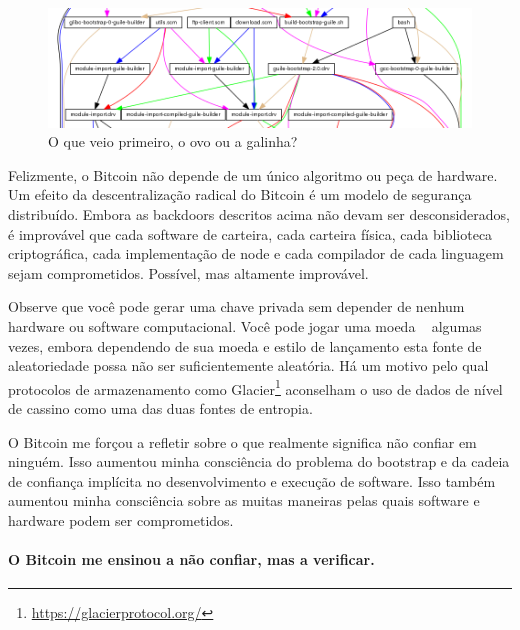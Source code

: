 \begin{figure}
  \includegraphics{assets/images/guix-bootstrap-dependencies.png}
  \caption{O que veio primeiro, o ovo ou a galinha?}
  \label{fig:guix-bootstrap-dependencies}
\end{figure}

Felizmente, o Bitcoin não depende de um único algoritmo ou peça de hardware. Um efeito da descentralização radical do Bitcoin é um modelo de segurança distribuído. Embora as backdoors descritos acima não devam ser desconsiderados, é improvável que cada software de carteira, cada carteira física, cada biblioteca criptográfica, cada implementação de node e cada compilador de cada linguagem sejam comprometidos. Possível, mas altamente improvável.

Observe que você pode gerar uma chave privada sem depender de nenhum hardware ou software computacional. Você pode jogar uma moeda ~\cite{antonopoulos2014mastering} algumas vezes, embora dependendo de sua moeda e estilo de lançamento esta fonte de aleatoriedade possa não ser suficientemente aleatória. Há um motivo pelo qual protocolos de armazenamento como Glacier\footnote{\url{https://glacierprotocol.org/}} aconselham o uso de dados de nível de cassino como uma das duas fontes de entropia.

O Bitcoin me forçou a refletir sobre o que realmente significa não confiar em ninguém. Isso aumentou minha consciência do problema do bootstrap e da cadeia de confiança implícita no desenvolvimento e execução de software. Isso também aumentou minha consciência sobre as muitas maneiras pelas quais software e hardware podem ser comprometidos.

\paragraph{O Bitcoin me ensinou a não confiar, mas a verificar.}

